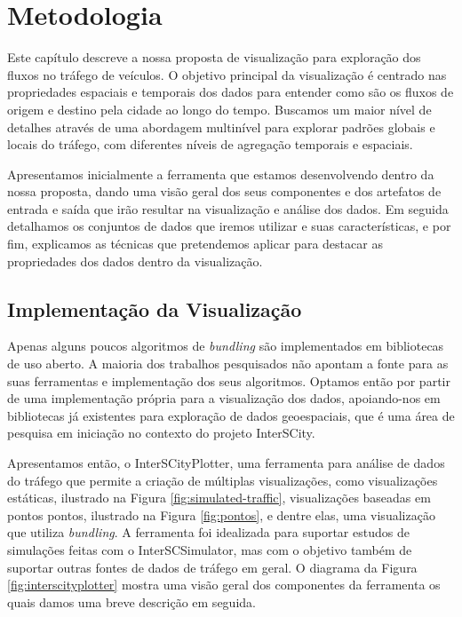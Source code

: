 \chapter{Metodologia}
\label{cap:metodologia}
 Este capítulo descreve a nossa proposta de visualização para exploração dos
fluxos no tráfego de veículos. O objetivo principal da visualização é centrado
nas propriedades espaciais e temporais dos dados para entender como são os
fluxos de origem e destino pela cidade ao longo do tempo. Buscamos um maior
nível de detalhes através de uma abordagem multinível para explorar padrões
globais e locais do tráfego, com diferentes níveis de agregação temporais e
espaciais.

 Apresentamos inicialmente a ferramenta que estamos desenvolvendo dentro da
nossa proposta, dando uma visão geral dos seus componentes e dos artefatos de
entrada e saída que irão resultar na visualização e análise dos dados. Em
seguida detalhamos os conjuntos de dados que iremos utilizar e suas características, e
por fim, explicamos as técnicas que pretendemos aplicar para destacar as propriedades
dos dados dentro da visualização.

\section{Implementação da Visualização}
  Apenas alguns poucos algoritmos de \emph{bundling} são implementados em
bibliotecas de uso aberto. A maioria dos trabalhos pesquisados não apontam
a fonte para as suas ferramentas e implementação dos seus algoritmos. Optamos
então por partir de uma implementação própria para a visualização dos dados,
apoiando-nos em bibliotecas já existentes para exploração de dados geoespaciais,
que é uma área de pesquisa em iniciação no contexto do projeto InterSCity.

  Apresentamos então, o InterSCityPlotter, uma ferramenta para análise de dados
do tráfego que permite a criação de múltiplas visualizações, como visualizações
estáticas, ilustrado na Figura \ref{fig:simulated-traffic}, visualizações
baseadas em pontos pontos, ilustrado na Figura \ref{fig:pontos}, e dentre
elas, uma visualização que utiliza \emph{bundling}. A ferramenta foi idealizada para
suportar estudos de simulações feitas com o InterSCSimulator, mas com o objetivo
também de suportar outras fontes de dados de tráfego em geral. O diagrama da Figura
\ref{fig:interscityplotter} mostra uma visão geral dos componentes da
ferramenta os quais damos uma breve descrição em seguida.


